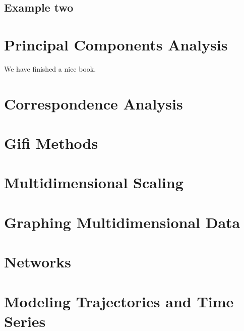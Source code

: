 \documentclass[
]{book}
\begin{document}
\hypertarget{example-two}{%
\section{Example two}\label{example-two}}

\hypertarget{principal-components-analysis-1}{%
\chapter{Principal Components Analysis}\label{principal-components-analysis-1}}

We have finished a nice book.

\hypertarget{correspondence-analysis}{%
\chapter{Correspondence Analysis}\label{correspondence-analysis}}

\hypertarget{gifi-methods}{%
\chapter{Gifi Methods}\label{gifi-methods}}

\hypertarget{multidimensional-scaling}{%
\chapter{Multidimensional Scaling}\label{multidimensional-scaling}}

\hypertarget{graphing-multidimensional-data}{%
\chapter{Graphing Multidimensional Data}\label{graphing-multidimensional-data}}

\hypertarget{networks}{%
\chapter{Networks}\label{networks}}

\hypertarget{modeling-trajectories-and-time-series}{%
\chapter{Modeling Trajectories and Time Series}\label{modeling-trajectories-and-time-series}}

  
\end{document}
